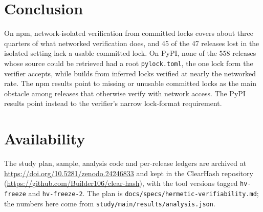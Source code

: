 \documentclass[11pt]{article}
\begin{document}
\section{Conclusion}

On npm, network-isolated verification from committed locks covers about
three quarters of what networked verification does, and 45 of the 47
releases lost in the isolated setting lack a usable committed lock. On
PyPI, none of the 558 releases whose source could be retrieved had a
root \texttt{pylock.toml}, the one lock form the verifier accepts, while builds from inferred locks verified at nearly the
networked rate. The npm results point to missing or unusable committed
locks as the main obstacle among releases that otherwise verify with
network access. The PyPI results point instead to the verifier's narrow
lock-format requirement.

\section*{Availability}

The study plan, sample, analysis code and per-release ledgers are archived
at \url{https://doi.org/10.5281/zenodo.24246833} and kept in the ClearHash
repository (\url{https://github.com/Builder106/clear-hash}), with the tool
versions tagged \texttt{hv-freeze} and \texttt{hv-freeze-2}. The plan is
\texttt{docs/specs/hermetic-verifiability.md}; the numbers here come from
\texttt{study/main/results/analysis.json}.



\end{document}
